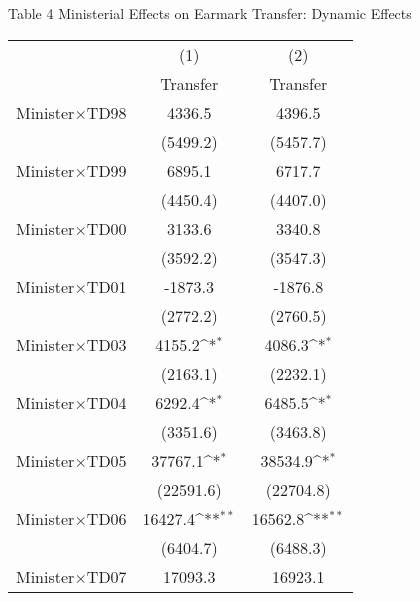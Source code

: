 \documentclass[11pt,a4paper]{article}
\begin{document}
\begin{center}
\begin{scriptsize}
\end{scriptsize}
\end{center}

\newpage

\begin{center}
Table 4 Ministerial Effects on Earmark Transfer: Dynamic Effects \\
\medskip
\begin{scriptsize}
{
\def\sym#1{\ifmmode^{#1}\else\(^{#1}\)\fi}
\begin{tabular}{l*{2}{c}}
\hline\hline
            &\multicolumn{1}{c}{(1)}&\multicolumn{1}{c}{(2)}\\
            &\multicolumn{1}{c}{Transfer}&\multicolumn{1}{c}{Transfer}\\
\hline
Minister\(\times\)TD98       &      4336.5         &      4396.5         \\
            &    (5499.2)         &    (5457.7)         \\
[1em]
Minister\(\times\)TD99       &      6895.1         &      6717.7         \\
            &    (4450.4)         &    (4407.0)         \\
[1em]
Minister\(\times\)TD00       &      3133.6         &      3340.8         \\
            &    (3592.2)         &    (3547.3)         \\
[1em]
Minister\(\times\)TD01       &     -1873.3         &     -1876.8         \\
            &    (2772.2)         &    (2760.5)         \\
[1em]
Minister\(\times\)TD03       &      4155.2\sym{*}  &      4086.3\sym{*}  \\
            &    (2163.1)         &    (2232.1)         \\
[1em]
Minister\(\times\)TD04       &      6292.4\sym{*}  &      6485.5\sym{*}  \\
            &    (3351.6)         &    (3463.8)         \\
[1em]
Minister\(\times\)TD05       &     37767.1\sym{*}  &     38534.9\sym{*}  \\
            &   (22591.6)         &   (22704.8)         \\
[1em]
Minister\(\times\)TD06       &     16427.4\sym{**} &     16562.8\sym{**} \\
            &    (6404.7)         &    (6488.3)         \\
[1em]
Minister\(\times\)TD07       &     17093.3         &     16923.1         \\

\end{tabular}}
\end{scriptsize}
\end{center}
\end{document}

